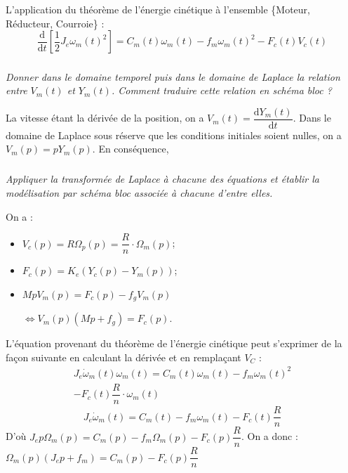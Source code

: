 \documentclass[10pt,fleqn]{article} %
\begin{document}
\begin{multicols}{2}
L'application du théorème de l'énergie cinétique à l'ensemble \{Moteur, Réducteur, Courroie\} :
\begin{equation}
\dfrac{\text{d}}{\text{d}t}\left[ \dfrac{1}{2} J_e \omega_m(t)^2 \right] =  C_m(t) \omega_m(t) - f_m\omega_m(t)^2 - F_c(t) V_c(t) 
\end{equation}

\subparagraph{} \textit{Donner dans le domaine temporel puis dans le domaine de Laplace la relation entre $V_m(t)$ et $Y_m(t)$. Comment traduire cette relation en schéma bloc ?}
\ifprof
\begin{corrige}
La vitesse étant la dérivée de la position, on a $V_m(t) = \dfrac{\text{d}Y_m(t)}{\text{d}t}$. Dans le domaine de Laplace sous réserve que les conditions initiales soient nulles, on a 
$V_m(p)=pY_m(p)$. En conséquence, 

\begin{center}
\end{center}

\end{corrige}
\else
\fi

\subparagraph{} \textit{Appliquer la transformée de Laplace à chacune des équations et établir la modélisation par schéma bloc associée à chacune d'entre elles.}
\ifprof
\begin{corrige}
On a :
\begin{itemize}
\item [\tiny\color{violet}{ $\blacksquare$}] $V_c(p)=R\Omega_p(p)=\dfrac{R}{n}\cdot \Omega_m(p)$;
\item [\tiny\color{violet}{ $\blacksquare$}] $F_c(p)=K_e\left(Y_c(p) - Y_m(p) \right)$;
\item [\tiny\color{violet}{ $\blacksquare$}] $MpV_m(p) = F_c(p) - f_g V_m(p)$

 $\Longleftrightarrow V_m(p)\left(Mp + f_g \right) = F_c(p) $.
\end{itemize}

L'équation provenant du théorème de l'énergie cinétique peut s'exprimer de la façon suivante en calculant la dérivée et en remplaçant $V_C$ : 
\begin{eqnarray*}J_e \dot{\omega}_m(t) \omega_m(t)= 
C_m(t) \omega_m(t) - f_m\omega_m(t)^2 \\
 - F_c(t) \dfrac{R}{n} \cdot \omega_m(t) 
\end{eqnarray*}
$$
J_e \dot{\omega}_m(t) =  
C_m(t) - f_m\omega_m(t) - F_c(t) \dfrac{R}{n} 
$$
D'où  $J_e p\Omega_m(p) =  
C_m(p) - f_m\Omega_m(p) - F_c(p) \dfrac{R}{n} $. On a donc :
$\Omega_m(p) \left( J_e p + f_m\right) =  
C_m(p)  - F_c(p) \dfrac{R}{n} $ 


\end{corrige}
\end{multicols}
\end{document}
